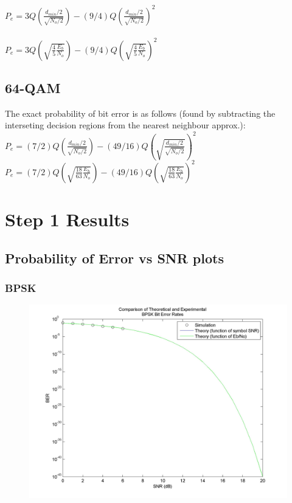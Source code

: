 \documentclass[]{article}
\begin{document}
$ P_e = 3Q(\frac{d_{min}/2}{\sqrt{N_o/2}})-(9/4)Q(\frac{d_{min}/2}{\sqrt{N_o/2}})^2$ \\
\\
$ P_e = 3Q(\sqrt{\frac{4}{5}\frac{E_b}{N_o}})-(9/4)Q(\sqrt{\frac{4}{5}\frac{E_{b}}{N_o}})^2$  \\

\subsection{64-QAM}
\label{sec:qam64}
The exact probability of bit error is as follows (found by subtracting the interseting decision regions from the nearest neighbour approx.):\\

$P_e = (7/2)Q(\frac{d_{min}/2}{\sqrt{N_o/2}}) -(49/16)Q(\sqrt{\frac{d_{min}/2}{\sqrt{N_o/2}}})^2$ \\

$P_e = (7/2)Q(\sqrt{\frac{18}{63}\frac{E_b}{N_o}})-(49/16)Q(\sqrt{\frac{18}{63}\frac{E_b}{N_o}})^2$ \\



\section{Step 1 Results}
\subsection{Probability of Error vs SNR plots}

\subsubsection{BPSK}
\begin{figure}[H]
\centering
\includegraphics[width=\textwidth]{bpSNR.jpg}
\caption{}
\end{figure}
\end{document}
